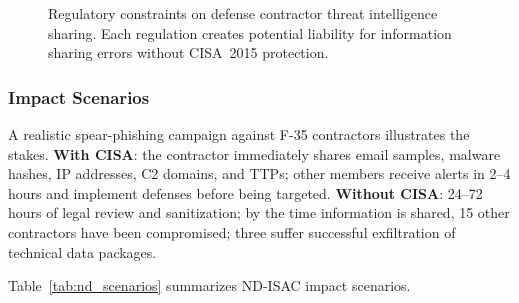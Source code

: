 \documentclass[journal]{IEEEtran}
\begin{document}
\begin{figure}[!t]
\centering
{}
\caption{Regulatory constraints on defense contractor threat intelligence sharing. Each regulation creates potential liability for information sharing errors without CISA~2015 protection.}
\label{fig:defense_complexity}
\end{figure}

\subsubsection{Impact Scenarios}
A realistic spear-phishing campaign against F-35 contractors illustrates the stakes. \textbf{With CISA}: the contractor immediately shares email samples, malware hashes, IP addresses, C2 domains, and TTPs; other members receive alerts in 2--4 hours and implement defenses before being targeted. \textbf{Without CISA}: 24--72 hours of legal review and sanitization; by the time information is shared, 15 other contractors have been compromised; three suffer successful exfiltration of technical data packages.

Table~\ref{tab:nd_scenarios} summarizes ND-ISAC impact scenarios.
\end{document}
